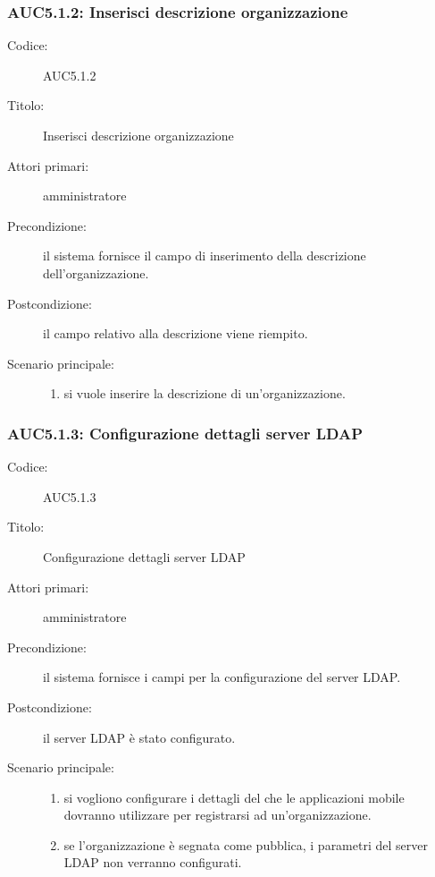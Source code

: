 \documentclass[../../../analisi-dei-requisiti.tex]{subfiles}
\begin{document}
\subsubsection{AUC5.1.2: Inserisci descrizione organizzazione}%
  \label{subs:AUC5.1.2}
  \begin{description}
    \item[Codice:] AUC5.1.2
    \item[Titolo:] Inserisci descrizione organizzazione
    \item[Attori primari:] amministratore
    \item[Precondizione:] il sistema fornisce il campo di inserimento della descrizione dell'organizzazione.
    \item[Postcondizione:] il campo relativo alla descrizione viene riempito.
    \item[Scenario principale:]
    \begin{enumerate}
      \item si vuole inserire la descrizione di un'organizzazione.
    \end{enumerate}
  \end{description}

\subsubsection{AUC5.1.3: Configurazione dettagli server LDAP}%
  \label{subs:AUC5.1.3}
  \begin{description}
    \item[Codice:] AUC5.1.3
    \item[Titolo:] Configurazione dettagli server LDAP
    \item[Attori primari:] amministratore
    \item[Precondizione:] il sistema fornisce i campi per la configurazione del server LDAP.
    \item[Postcondizione:] il server LDAP è stato configurato.
    \item[Scenario principale:]
    \begin{enumerate}
      \item si vogliono configurare i dettagli del  che le applicazioni mobile dovranno utilizzare per registrarsi ad un'organizzazione.
      \item se l'organizzazione è segnata come pubblica, i parametri del server LDAP non verranno configurati.
    \end{enumerate}
  \end{description}
\end{document}
